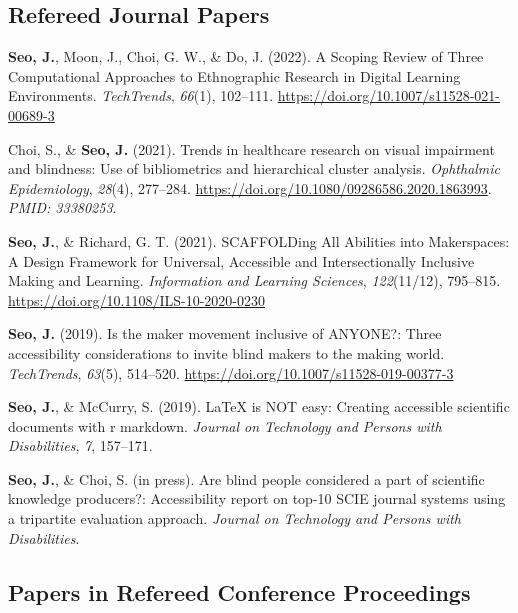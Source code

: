 \documentclass[11pt,a4paper,]{awesome-cv}
\begin{document}
\hypertarget{refereed-journal-papers}{%
    \subsection{Refereed Journal Papers}\label{refereed-journal-papers}}

\hypertarget{refs_journals}{}
\leavevmode{}%
\textbf{Seo, J.}, Moon, J., Choi, G. W., \& Do, J. (2022). A {Scoping
        Review} of {Three Computational Approaches} to {Ethnographic Research}
in {Digital Learning Environments}. \emph{TechTrends}, \emph{66}(1),
102--111. \url{https://doi.org/10.1007/s11528-021-00689-3}

\leavevmode{}%
Choi, S., \& \textbf{Seo, J.} (2021). Trends in healthcare research on
visual impairment and blindness: Use of bibliometrics and hierarchical
cluster analysis. \emph{Ophthalmic Epidemiology}, \emph{28}(4),
277--284. \url{https://doi.org/10.1080/09286586.2020.1863993}.
\emph{PMID: 33380253}.

\leavevmode{}%
\textbf{Seo, J.}, \& Richard, G. T. (2021). {SCAFFOLDing All Abilities}
into {Makerspaces}: {A Design Framework} for {Universal}, {Accessible}
and {Intersectionally Inclusive Making} and {Learning}.
\emph{Information and Learning Sciences}, \emph{122}(11/12), 795--815.
\url{https://doi.org/10.1108/ILS-10-2020-0230}

\leavevmode{}%
\textbf{Seo, J.} (2019). Is the maker movement inclusive of {ANYONE}?:
Three accessibility considerations to invite blind makers to the making
world. \emph{{TechTrends}}, \emph{63}(5), 514--520.
\url{https://doi.org/10.1007/s11528-019-00377-3}

\leavevmode{}%
\textbf{Seo, J.}, \& McCurry, S. (2019). LaTeX is NOT easy: Creating
accessible scientific documents with r markdown. \emph{Journal on
    Technology and Persons with Disabilities}, \emph{7}, 157--171.

\leavevmode{}%
\textbf{Seo, J.}, \& Choi, S. (in press). Are blind people considered a
part of scientific knowledge producers?: Accessibility report on top-10
SCIE journal systems using a tripartite evaluation approach.
\emph{Journal on Technology and Persons with Disabilities}.

\hypertarget{papers-in-refereed-conference-proceedings}{%
    \subsection{Papers in Refereed Conference
        Proceedings}\label{papers-in-refereed-conference-proceedings}}
\end{document}
